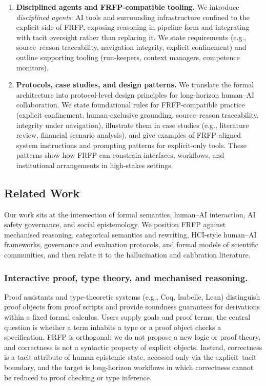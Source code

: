 \documentclass[preprints,accept]{Definitions/mdpi}
\theoremstyle{definition}
\begin{document}
\begin{enumerate}
  \item \textbf{Disciplined agents and FRFP-compatible tooling.}
  We introduce \emph{disciplined agents}: AI tools and surrounding infrastructure confined to the explicit side of FRFP, exposing reasoning in pipeline form and integrating with tacit oversight rather than replacing it. We state requirements (e.g., source--reason traceability, navigation integrity, explicit confinement) and outline supporting tooling (run-keepers, context managers, competence monitors).

  \item \textbf{Protocols, case studies, and design patterns.}
  We translate the formal architecture into protocol-level design principles for long-horizon human--AI collaboration. We state foundational rules for FRFP-compatible practice (explicit confinement, human-exclusive grounding, source--reason traceability, integrity under navigation), illustrate them in case studies (e.g., literature review, financial scenario analysis), and give examples of FRFP-aligned system instructions and prompting patterns for explicit-only tools. These patterns show how FRFP can constrain interfaces, workflows, and institutional arrangements in high-stakes settings.
\end{enumerate}

\subsection{Related Work}

Our work sits at the intersection of formal semantics, human--AI interaction, AI safety governance, and social epistemology. We position FRFP against mechanised reasoning, categorical semantics and rewriting, HCI-style human--AI frameworks, governance and evaluation protocols, and formal models of scientific communities, and then relate it to the hallucination and calibration literature.

\subsubsection{Interactive proof, type theory, and mechanised reasoning.}
Proof assistants and type-theoretic systems (e.g., Coq, Isabelle, Lean) distinguish proof objects from proof scripts and provide soundness guarantees for derivations within a fixed formal calculus. Users supply goals and proof terms; the central question is whether a term inhabits a type or a proof object checks a specification. FRFP is orthogonal: we do not propose a new logic or proof theory, and correctness is not a syntactic property of explicit objects. Instead, correctness is a tacit attribute of human epistemic state, accessed only via the explicit--tacit boundary, and the target is long-horizon workflows in which correctness cannot be reduced to proof checking or type inference.
\end{document}
